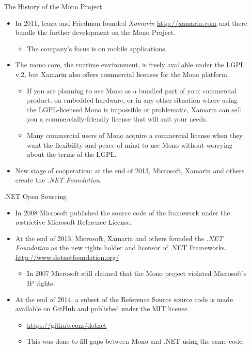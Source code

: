 \documentclass{beamer}
\begin{document}
\begin{frame}{The History of the Mono Project}
\begin{itemize}
\item In 2011, Icaza and Friedman founded \emph{Xamarin}
  \url{http://xamarin.com} and there bundle the further development on the
  Mono Project.
  \begin{itemize}
  \item The company's focus is on mobile applications.
  \end{itemize}
\item The mono core, the runtime environment, is freely available under the
  LGPL v.2, but Xamarin also offers commercial licenses for the Mono
  platform. 
  \begin{itemize}
  \item If you are planning to use Mono as a bundled part of your commercial
    product, on embedded hardware, or in any other situation where using the
    LGPL-licensed Mono is impossible or problematic, Xamarin can sell you a
    commercially-friendly license that will suit your needs.
  \item Many commercial users of Mono acquire a commercial license when they
    want the flexibility and peace of mind to use Mono without worrying about
    the terms of the LGPL.
  \end{itemize}
\item New stage of cooperation: at the end of 2013, Microsoft, Xamarin and
  others create the \emph{.NET Foundation}.
\end{itemize}
\end{frame}

\begin{frame}{.NET Open Sourcing}
\begin{itemize}
\item In 2008 Microsoft published the source code of the framework under the
  restrictive Microsoft Reference License.
\item At the end of 2013, Microsoft, Xamarin and others founded the \emph{.NET
  Foundation} as the new rights holder and licensor of .NET Frameworks.
  \url{http://www.dotnetfoundation.org/}
  \begin{itemize}
  \item In 2007 Microsoft still claimed that the Mono project violated
    Microsoft's IP rights.
  \end{itemize}
\item At the end of 2014, a subset of the Reference Source source code is made
  available on GitHub and published under the MIT license.
  \begin{itemize}
  \item \url{https://github.com/dotnet}
  \item This was done to fill gaps between Mono and .NET using the same code.
  \end{itemize}
\end{itemize}
\end{frame}
\end{document}

